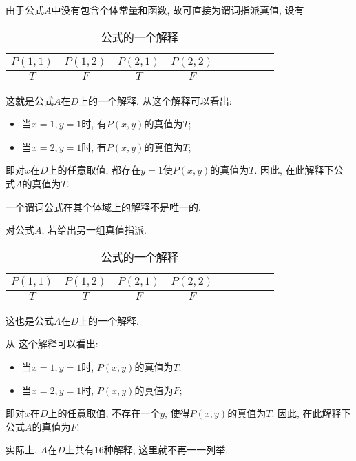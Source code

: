 \begin{result}
由于公式$A$中没有包含个体常量和函数, 故可直接为谓词指派真值, 设有
\begin{table}[H]
\caption{公式的一个解释}
\vspace{-0.6cm}
\begin{center}
\begin{tabular} {ccccccccc}
  \hline
     $P(1,1)$&	  $P(1,2)$	&   $P(2,1)$&	   $P(2,2)$\\
  \hline
     \textcolor[rgb]{0,0,1}{$T$}	&      $F$	  &  \textcolor[rgb]{0,0,1}{$T$}	    &   $F$\\
\hline
\end{tabular}
\end{center}
\label{AI_table2019113001}
\end{table}
这就是公式$A$在$D$上的一个解释. 从这个解释可以看出:
\begin{itemize}
    \item 当$x=1, y=1$时, 有$P(x,y)$的真值为$T$;
    \item 当$x=2, y=1$时, 有$P(x,y)$的真值为$T$;
\end{itemize}
即对$x$在$D$上的任意取值, 都存在$y=1$使$P(x,y)$的真值为$T$. 因此, 在此解释下公式$A$的真值为$T$.
\begin{remark}
    一个谓词公式在其个体域上的解释不是唯一的.
\begin{example}
对公式$A$, 若给出另一组真值指派.
\begin{table}[H]
\caption{公式的一个解释}
\vspace{-0.6cm}
\begin{center}
\begin{tabular} {ccccccccc}
\hline
     $P(1,1)$&	  $P(1,2)$	&   $P(2,1)$&	   $P(2,2)$\\
\hline
     $T$	&      $T$	  &   $F$	    &   $F$\\
\hline
\end{tabular}
\end{center}
\label{AI_table2019113002}
\end{table}
这也是公式$A$在$D$上的一个解释.
\end{example}
\end{remark}
从 这个解释可以看出:
\begin{itemize}
    \item 当$x=1,y=1$时, $P(x,y)$的真值为$T$;
    \item 当$x=2,y=1$时, $P(x,y)$的真值为$F$;
\end{itemize}
即对$x$在$D$上的任意取值, 不存在一个$y$, 使得$P(x,y)$的真值为$T$. 因此, 在此解释下公式$A$的真值为$F$.
\begin{remark}
    实际上, $A$在$D$上共有16种解释, 这里就不再一一列举.
\end{remark}
\end{result}
